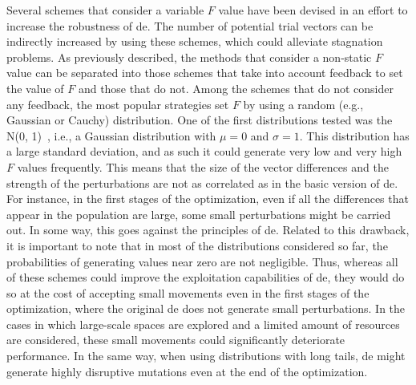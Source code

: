 \documentclass[preprint,3p]{elsarticle}
\newcommand{\DE}{{\sc de}}
\begin{document}
Several schemes that consider a variable $F$ value have been devised in an effort to increase the robustness of \DE{}. %
%
The number of potential trial vectors can be indirectly increased by using these schemes, which could alleviate
stagnation problems.
%
As previously described, the methods that consider a non-static $F$ value can be separated into those schemes that take into account
feedback to set the value of $F$ and those that do not.
%
Among the schemes that do not consider any feedback, the most popular
strategies set $F$ by using a random (e.g., Gaussian or Cauchy) distribution.
%
One of the first distributions tested was the N(0, 1)~\cite{Abbass:02}, i.e., a Gaussian distribution with $\mu = 0$ and $\sigma = 1$.
%
This distribution has a large standard deviation, and as such it could generate very low and very high $F$ values frequently.
%
This means that the size of the vector differences and the strength of the perturbations
are not as correlated as in the basic version of \DE{}.
%
For instance, in the first stages of the optimization, even if all the differences that appear in the population are large,
some small perturbations might be carried out.
%
In some way, this goes against the principles of \DE{}.
%
Related to this drawback, it is important to note that in most of the distributions considered so far,
the probabilities of generating values near zero are not negligible.
%
Thus, whereas all of these schemes could improve the exploitation capabilities of \DE{}, they would do so at the cost of accepting
small movements even in the first stages of the optimization, where the original \DE{} does not generate small
perturbations.
%
%
In the cases in which large-scale spaces are explored and a limited amount of resources are considered, these small movements
could significantly deteriorate performance.
%
In the same way, when using distributions with long tails, 
%
%
%
%
\DE{} might generate highly disruptive mutations even at the end of the optimization. %
\end{document}
